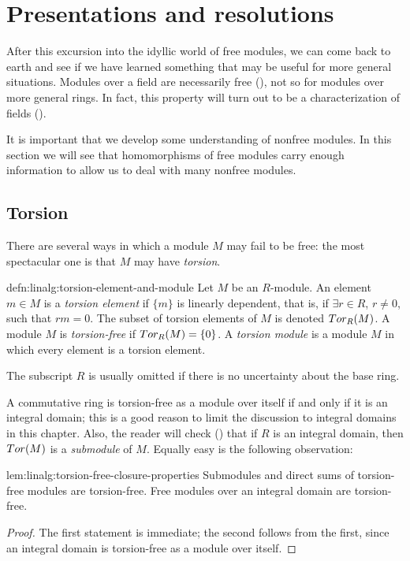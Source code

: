 \section{Presentations and resolutions}
\label{sec:linalg:presentations-and-resolutions}

After this excursion into the idyllic world of free modules, we can
come back to earth and see if we have learned something that may be
useful for more general situations. Modules over a field are
necessarily free (), not so for modules over more
general rings. In fact, this property will turn out to be a
characterization of fields ().

It is important that we develop some understanding of nonfree modules.
In this section we will see that homomorphisms of free modules carry
enough information to allow us to deal with many nonfree modules.

\subsection{Torsion}
\label{subsec:linalg:torsion}
There are several ways in which a module $M$ may fail to be free: the
most spectacular one is that $M$ may have \emph{torsion}.

\begin{defn}{}{defn:linalg:torsion-element-and-module}
  Let $M$ be an $R$-module. An element $m \in M$ is a \emph{torsion
    element} if $\{m\}$ is linearly dependent, that is, if
  $\exists r \in R$, $r \neq 0$, such that $rm = 0$. The subset of
  torsion elements of $M$ is denoted $Tor_R(M)$. A module $M$ is
  \emph{torsion-free} if $Tor_R(M) = \{0\}$. A \emph{torsion module}
  is a module $M$ in which every element is a torsion element.
\end{defn}
The subscript $R$ is usually omitted if there is no uncertainty about
the base ring.

A commutative ring is torsion-free as a module over itself if and only
if it is an integral domain; this is a good reason to limit the
discussion to integral domains in this chapter. Also, the reader will
check () that if $R$
is an integral domain, then $Tor(M)$ is a \emph{submodule} of
$M$. Equally easy is the following observation:
\begin{lem}{}{lem:linalg:torsion-free-closure-properties}
  Submodules and direct sums of torsion-free modules are torsion-free.
  Free modules over an integral domain are torsion-free.
\end{lem}
\begin{proof}
  The first statement is immediate; the second follows from the first,
  since an integral domain is torsion-free as a module over itself.
\end{proof}

